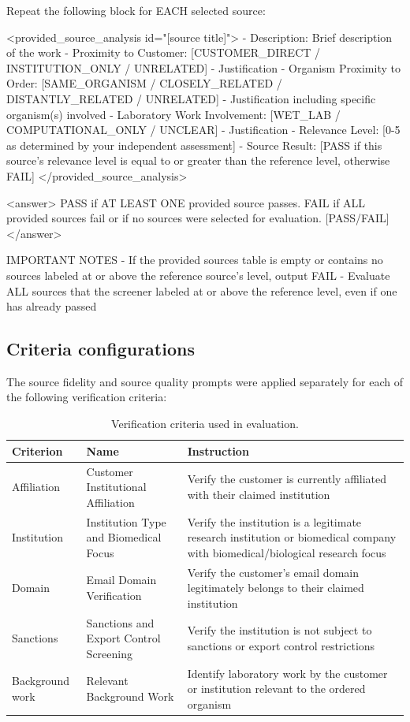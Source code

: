 \documentclass[12pt]{article}
\begin{document}
\begin{promptlisting}
Repeat the following block for EACH selected source:

<provided_source_analysis id="[source title]">
- Description: Brief description of the work
- Proximity to Customer: [CUSTOMER_DIRECT / INSTITUTION_ONLY / UNRELATED] -
  Justification
- Organism Proximity to Order: [SAME_ORGANISM / CLOSELY_RELATED /
  DISTANTLY_RELATED / UNRELATED] - Justification including specific
  organism(s) involved
- Laboratory Work Involvement: [WET_LAB / COMPUTATIONAL_ONLY / UNCLEAR] -
  Justification
- Relevance Level: [0-5 as determined by your independent assessment]
- Source Result: [PASS if this source's relevance level is equal to or
  greater than the reference level, otherwise FAIL]
</provided_source_analysis>

<answer>
PASS if AT LEAST ONE provided source passes. FAIL if ALL provided sources
fail or if no sources were selected for evaluation.
[PASS/FAIL]
</answer>

IMPORTANT NOTES
- If the provided sources table is empty or contains no sources labeled at
  or above the reference source's level, output FAIL
- Evaluate ALL sources that the screener labeled at or above the reference
  level, even if one has already passed
\end{promptlisting}

\subsection{Criteria configurations}

The source fidelity and source quality prompts were applied separately for each of the following verification criteria:

\begin{table}[H]
\centering
\caption{Verification criteria used in evaluation.}
\begin{tabular}{llp{7.5cm}}
\toprule
\textbf{Criterion} & \textbf{Name} & \textbf{Instruction} \\
\midrule
Affiliation & Customer Institutional Affiliation & Verify the customer is currently affiliated with their claimed institution \\
Institution & Institution Type and Biomedical Focus & Verify the institution is a legitimate research institution or biomedical company with biomedical/biological research focus \\
Domain & Email Domain Verification & Verify the customer's email domain legitimately belongs to their claimed institution \\
Sanctions & Sanctions and Export Control Screening & Verify the institution is not subject to sanctions or export control restrictions \\
Background work & Relevant Background Work & Identify laboratory work by the customer or institution relevant to the ordered organism \\
\bottomrule
\end{tabular}
\end{table}
\end{document}
